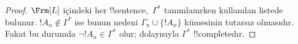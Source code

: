 \documentclass[../../../include/open-logic-section]{subfiles}
\begin{document}
\begin{proof}
$\Frm[L]$ içindeki her !!{sentence},~$\Gamma^*$ tanımlanırken kullanılan
listede bulunur. $!A_n\notin\Gamma^*$ ise bunun nedeni
$\Gamma_n\cup\{!A_n\}$ kümesinin tutarsız olmasıdır. Fakat bu durumda
$\lnot !A_n\in\Gamma^*$ olur; dolayısıyla $\Gamma^*$ !!{complete}{}dır.
\end{proof}
\end{document}
